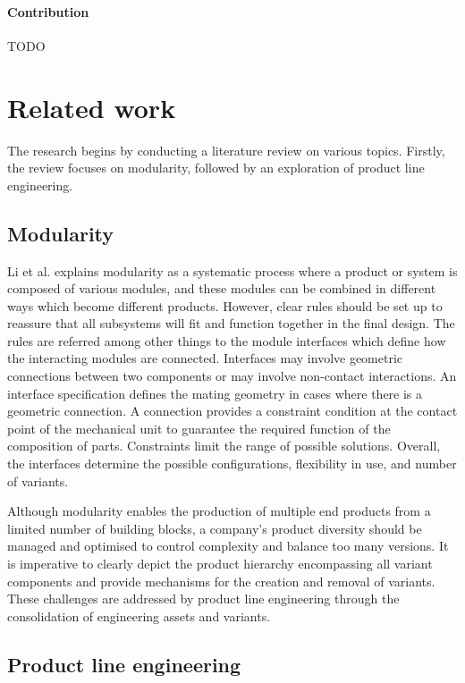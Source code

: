 \documentclass[sigconf,review]{acmart}
\begin{document}
\paragraph{Contribution}

TODO

\section{Related work}
\label{sec:related-work}

The research begins by conducting a literature review on various topics. 
Firstly, the review focuses on modularity, followed by an exploration of product line engineering.

\subsection{Modularity}
\label{sec:modualarity}

Li et al. explains modularity as a systematic process where a product or system is composed of various modules, and these modules can be combined in different ways which become different products. 
However, clear rules should be set up to reassure that all subsystems will fit and function together in the final design.
The rules are referred among other things to the module interfaces which define how the interacting modules are connected.
Interfaces may involve geometric connections between two components or may involve non-contact interactions. An interface specification defines the mating geometry in cases where there is a geometric connection.
A connection provides a constraint condition at the contact point of the mechanical unit to guarantee the required function of the composition of parts.
Constraints limit the range of possible solutions.
Overall, the interfaces determine the possible configurations, flexibility in use, and number of variants. 

Although modularity enables the production of  multiple end products from a limited number of building blocks, a company's product diversity should be managed and optimised to control complexity and balance too many versions. 
It is imperative to clearly depict the product hierarchy encompassing all variant components and provide mechanisms for the creation and removal of variants. 
These challenges are addressed by product line engineering through the consolidation of engineering assets and variants.
\subsection{Product line engineering}
\label{sec:product line engineering}
\end{document}
